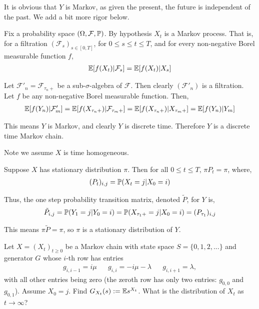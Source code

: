 \begin{solution}
It is obvious that \( Y \) is Markov, as given the present, the future is independent of the past. We add a bit more rigor below.

Fix a probability space \( (\Omega, \mathcal{F}, \mathbb{P}) \).
By hypothesis \( X_t \) is a Markov process. That is, for a filtration \( (\mathcal{F}_s)_{s\in[0,T]} \), for \( 0\leq s\leq t\leq T \), and for every non-negative Borel measurable function \( f \), 
\begin{align*}
    \mathbb{E}[f(X_t) | \mathcal{F}_s] = \mathbb{E}[f(X_t)|X_s]
\end{align*}

Let \( \mathcal{F}'_n = \mathcal{F}_{\tau_n+} \) be a sub-\( \sigma \)-algebra of \( \mathcal{F} \). Then clearly \( (\mathcal{F}'_n) \) is a filtration. Let \( f \) be any non-negative Borel measurable function. Then,
\begin{align*}
    \mathbb{E}[f(Y_n) | \mathcal{F}'_m] = \mathbb{E}[f(X_{\tau_n+}) | \mathcal{F}_{\tau_m+}] = \mathbb{E}[f(X_{\tau_n+}) | X_{\tau_m+}] = \mathbb{E}[f(Y_n) | Y_m]
\end{align*}

This means \( Y \) is Markov, and clearly \( Y \) is discrete time. Therefore \( Y \) is a discrete time Markov chain.



Note we assume \( X \) is time homogeneous.

Suppose \( X \) has stationary distribution \( \pi \). Then for all \( 0\leq t \leq T \), \( \pi P_t = \pi \), where,
\begin{align*}
    (P_t)_{i,j} = \mathbb{P}(X_t = j | X_0 = i)
\end{align*}

Thus, the one step probability transition matrix, denoted \( \tilde{P} \), for \( Y \) is,
\begin{align*}
    \tilde{P}_{i,j} = \mathbb{P}(Y_1=j | Y_0 = i) = \mathbb{P}( X_{\tau_1+}=j | X_0 = i) = (P_{\tau_1})_{i,j}
\end{align*}

This means \( \pi \tilde{P} = \pi \), so \( \pi \) is a stationary distribution of \( Y \).
\end{solution}

\pagebreak
\begin{problem}[Exercise 5.3]
    Let \( X=(X_t)_{t\geq 0} \) be a Markov chain with state space \( S=\{0,1,2,...\} \) and generator \( G \) whose \( i \)-th row has entries
    \begin{align*}
        g_{i,i-1} = i\mu && g_{i,i} = -i\mu-\lambda && g_{i,i+1} = \lambda,
    \end{align*}
    with all other entries being zero (the zeroth row has only two entries: \( g_{0,0} \) and \( g_{0,1} \)). Assume \( X_0=j \). Find \( G_{X_t}(s) := \mathbb{E} s^{X_t} \). What is the distribution of \( X_t \) as \( t\to\infty \)?
\end{problem}

